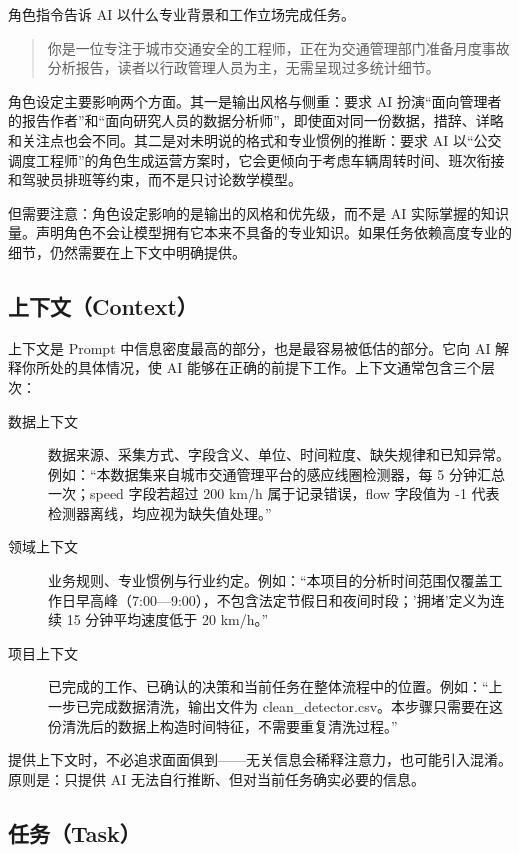 角色指令告诉 AI 以什么专业背景和工作立场完成任务。

\begin{quote}
你是一位专注于城市交通安全的工程师，正在为交通管理部门准备月度事故分析报告，读者以行政管理人员为主，无需呈现过多统计细节。
\end{quote}

角色设定主要影响两个方面。其一是输出风格与侧重：要求 AI 扮演“面向管理者的报告作者”和“面向研究人员的数据分析师”，即使面对同一份数据，措辞、详略和关注点也会不同。其二是对未明说的格式和专业惯例的推断：要求 AI 以“公交调度工程师”的角色生成运营方案时，它会更倾向于考虑车辆周转时间、班次衔接和驾驶员排班等约束，而不是只讨论数学模型。

但需要注意：角色设定影响的是输出的风格和优先级，而不是 AI 实际掌握的知识量。声明角色不会让模型拥有它本来不具备的专业知识。如果任务依赖高度专业的细节，仍然需要在上下文中明确提供。

\subsection{上下文（Context）}

上下文是 Prompt 中信息密度最高的部分，也是最容易被低估的部分。它向 AI 解释你所处的具体情况，使 AI 能够在正确的前提下工作。上下文通常包含三个层次：

\begin{description}
  \item[数据上下文] 数据来源、采集方式、字段含义、单位、时间粒度、缺失规律和已知异常。例如：“本数据集来自城市交通管理平台的感应线圈检测器，每 5 分钟汇总一次；speed 字段若超过 200 km/h 属于记录错误，flow 字段值为 -1 代表检测器离线，均应视为缺失值处理。”
  \item[领域上下文] 业务规则、专业惯例与行业约定。例如：“本项目的分析时间范围仅覆盖工作日早高峰（7:00—9:00），不包含法定节假日和夜间时段；'拥堵'定义为连续 15 分钟平均速度低于 20 km/h。”
  \item[项目上下文] 已完成的工作、已确认的决策和当前任务在整体流程中的位置。例如：“上一步已完成数据清洗，输出文件为 clean\_detector.csv。本步骤只需要在这份清洗后的数据上构造时间特征，不需要重复清洗过程。”
\end{description}

提供上下文时，不必追求面面俱到——无关信息会稀释注意力，也可能引入混淆。原则是：只提供 AI 无法自行推断、但对当前任务确实必要的信息。

\subsection{任务（Task）}

